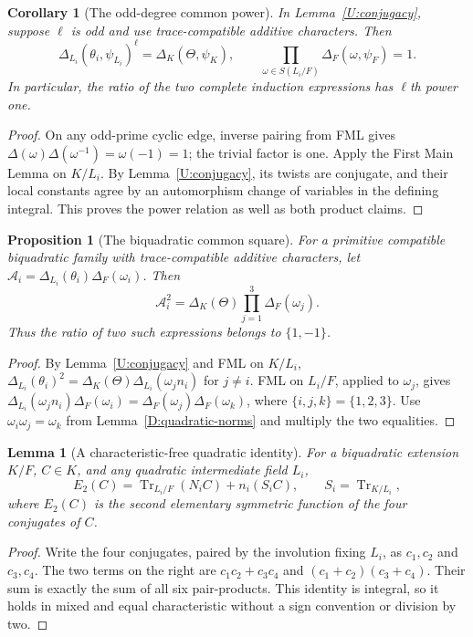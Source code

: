 \documentclass[11pt]{amsart}
\newtheorem{proposition}[theorem]{Proposition}
\newtheorem{lemma}[theorem]{Lemma}
\newtheorem{corollary}[theorem]{Corollary}
\theoremstyle{definition}
\theoremstyle{remark}
\newcommand{\Tr}{\operatorname{Tr}}
\begin{document}
\begin{corollary}[The odd-degree common power]\label{U:odd-power}
In Lemma~\ref{U:conjugacy}, suppose $\ell$ is odd and use trace-compatible
additive characters. Then
\[
 \Delta_{L_i}(\theta_i,\psi_{L_i})^\ell=\Delta_K(\Theta,\psi_K),
 \qquad \prod_{\omega\in S(L_i/F)}\Delta_F(\omega,\psi_F)=1.
\]
In particular, the ratio of the two complete induction expressions
has $\ell$th power one.
\end{corollary}
\begin{proof}
On any odd-prime cyclic edge, inverse pairing from FML gives
$\Delta(\omega)\Delta(\omega^{-1})=\omega(-1)=1$; the trivial factor
is one. Apply the First Main Lemma on $K/L_i$. By
Lemma~\ref{U:conjugacy}, its twists are conjugate, and their local
constants agree by an automorphism change of variables in the defining
integral. This proves the power relation as well as both product claims.
\end{proof}

\begin{proposition}[The biquadratic common square]\label{U:quadratic-square}
For a primitive compatible biquadratic family with trace-compatible
additive characters, let $\mathcal A_i=\Delta_{L_i}(\theta_i)\Delta_F(\omega_i)$. Then
\[
 \mathcal A_i^2=\Delta_K(\Theta)\prod_{j=1}^3\Delta_F(\omega_j).
\]
Thus the ratio of two such expressions belongs to $\{1,-1\}$.
\end{proposition}
\begin{proof}
By Lemma~\ref{U:conjugacy} and FML on $K/L_i$,
$\Delta_{L_i}(\theta_i)^2=\Delta_K(\Theta)\Delta_{L_i}(\omega_jn_i)$
for $j\ne i$. FML on $L_i/F$, applied to $\omega_j$, gives
$\Delta_{L_i}(\omega_jn_i)\Delta_F(\omega_i)
 =\Delta_F(\omega_j)\Delta_F(\omega_k)$, where $\{i,j,k\}=\{1,2,3\}$.
Use $\omega_i\omega_j=\omega_k$ from Lemma~\ref{D:quadratic-norms}
and multiply the two equalities.
\end{proof}

\begin{lemma}[A characteristic-free quadratic identity]\label{U:e2}
For a biquadratic extension $K/F$, $C\in K$, and any quadratic
intermediate field $L_i$,
\[
 E_2(C)=\Tr_{L_i/F}(N_iC)+n_i(S_iC),\qquad S_i=\Tr_{K/L_i},
\]
where $E_2(C)$ is the second elementary symmetric function of the four
conjugates of $C$.
\end{lemma}
\begin{proof}
Write the four conjugates, paired by the involution fixing $L_i$, as
$c_1,c_2$ and $c_3,c_4$. The two terms on the right are
$c_1c_2+c_3c_4$ and $(c_1+c_2)(c_3+c_4)$.
Their sum is exactly the sum of all six pair-products. This identity is
integral, so it holds in mixed and equal characteristic without a sign
convention or division by two.
\end{proof}
\end{document}
